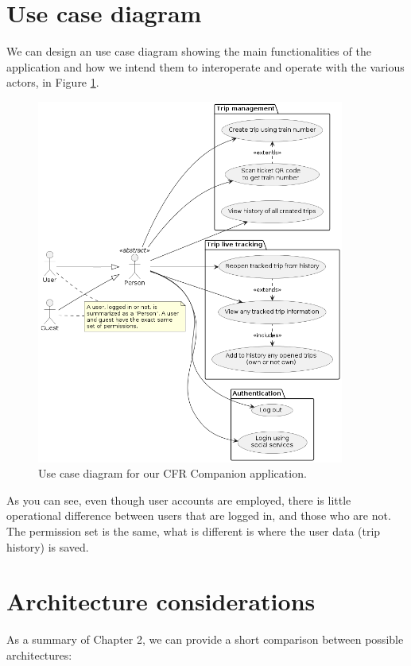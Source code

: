 \section{Use case diagram}

We can design an use case diagram showing the main functionalities of the application and how we intend them to interoperate and operate with the various actors, in Figure \ref{FigUseCase}.

\begin{figure}[htbp]
    \centering
    \includegraphics[width=0.9\textwidth]{./figures/ch3_use-case.png}
    \caption{Use case diagram for our CFR Companion application.}
    \label{FigUseCase}
\end{figure}

As you can see, even though user accounts are employed, there is little operational difference between users that are logged in, and those who are not. The permission set is the same, what is different is where the user data (trip history) is saved.

\section{Architecture considerations}
As a summary of Chapter 2, we can provide a short comparison between possible architectures:

